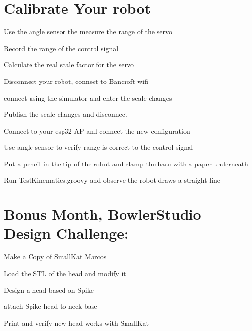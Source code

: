 \documentclass{article}
\begin{document}
\section{Calibrate Your robot}
\begin{todolist}
	\item Use the angle sensor the measure the range of the servo
	\item Record the range of the control signal
	\item Calculate the real scale factor for the servo
	\item Disconnect your robot, connect to Bancroft wifi
	\item connect using the simulator and enter the scale changes
	\item Publish the scale changes and disconnect
	\item Connect to your esp32 AP and connect the new configuration
	\item Use angle sensor to verify range is correct to the control signal
	\item Put a pencil in the tip of the robot and clamp the base with a paper underneath
	\item Run TestKinematics.groovy and observe the robot draws a straight line
\end{todolist}


\newpage
\section{Bonus Month, BowlerStudio Design Challenge:}
\begin{todolist}
	\item Make a Copy of SmallKat Marcos
	\item Load the STL of the head and modify it
	\item Design a head based on Spike
	\item attach Spike head to neck base
	\item Print and verify new head works with SmallKat
\end{todolist}

\newpage
\end{document}
